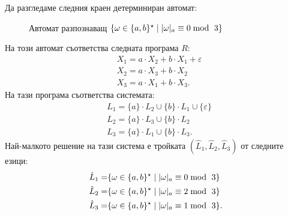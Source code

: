 \begin{example}
  Да разгледаме следния краен детерминиран автомат:
  \begin{figure}[H]
    \centering
    \caption{Автомат разпознаващ $\{\omega \in \{a,b\}^\star \mid \abs{\omega}_{a} \equiv 0 \bmod\ 3\}$}
  \end{figure}
  На този автомат съответства следната програма $R$:
  \begin{align*}
    & X_1 = a \cdot X_2 + b \cdot X_1 + \varepsilon \\
    & X_2 = a \cdot X_3 + b \cdot X_2\\
    & X_3 = a \cdot X_1 + b \cdot X_3.
  \end{align*}
  На тази програма съответства системата:
  \begin{align*}
    & L_1 = \{a\} \cdot L_2 \cup \{b\} \cdot L_1 \cup \{\varepsilon\}\\
    & L_2 = \{a\} \cdot L_3 \cup \{b\} \cdot L_2\\
    & L_3 = \{a\} \cdot L_1 \cup \{b\} \cdot L_3.
  \end{align*}
  Най-малкото решение на тази система е тройката $(\hat{L}_1,\hat{L}_2,\hat{L}_3)$ от следните езици:
  \begin{align*}
    \hat{L}_1 = & \{\omega \in \{a,b\}^\star \mid \vert{\omega}\vert_{a} \equiv 0 \bmod\ 3\}\\
    \hat{L}_2 = & \{\omega \in \{a,b\}^\star \mid \vert{\omega}\vert_{a} \equiv 2 \bmod\ 3\}\\
    \hat{L}_3 = & \{\omega \in \{a,b\}^\star \mid \vert{\omega}\vert_{a} \equiv 1 \bmod\ 3\}.
  \end{align*}
\end{example}

